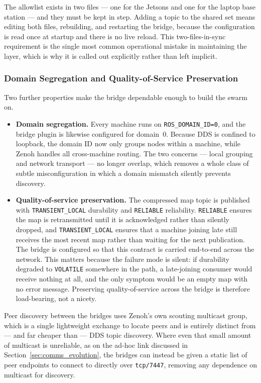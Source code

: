 \begin{notebox}
The allowlist exists in two files --- one for the Jetsons and one for the laptop base station --- and they must be kept in step. Adding a topic to the shared set means editing both files, rebuilding, and restarting the bridge, because the configuration is read once at startup and there is no live reload. This two-files-in-sync requirement is the single most common operational mistake in maintaining the layer, which is why it is called out explicitly rather than left implicit.
\end{notebox}

\subsubsection{Domain Segregation and Quality-of-Service Preservation}
\label{subsubsec:domain_qos}

Two further properties make the bridge dependable enough to build the swarm on.

\begin{itemize}
    \item \textbf{Domain segregation.} Every machine runs on \texttt{ROS\_DOMAIN\_ID=0}, and the bridge plugin is likewise configured for domain~0. Because DDS is confined to loopback, the domain ID now only groups nodes within a machine, while Zenoh handles all cross-machine routing. The two concerns --- local grouping and network transport --- no longer overlap, which removes a whole class of subtle misconfiguration in which a domain mismatch silently prevents discovery.
    \item \textbf{Quality-of-service preservation.} The compressed map topic is published with \texttt{TRANSIENT\_LOCAL} durability and \texttt{RELIABLE} reliability. \texttt{RELIABLE} ensures the map is retransmitted until it is acknowledged rather than silently dropped, and \texttt{TRANSIENT\_LOCAL} ensures that a machine joining late still receives the most recent map rather than waiting for the next publication. The bridge is configured so that this contract is carried end-to-end across the network. This matters because the failure mode is silent: if durability degraded to \texttt{VOLATILE} somewhere in the path, a late-joining consumer would receive nothing at all, and the only symptom would be an empty map with no error message. Preserving quality-of-service across the bridge is therefore load-bearing, not a nicety.
\end{itemize}

Peer discovery between the bridges uses Zenoh's own scouting multicast group, which is a single lightweight exchange to locate peers and is entirely distinct from --- and far cheaper than --- DDS topic discovery. Where even that small amount of multicast is unreliable, as on the ad-hoc link discussed in Section~\ref{sec:comms_evolution}, the bridges can instead be given a static list of peer endpoints to connect to directly over \texttt{tcp/7447}, removing any dependence on multicast for discovery.

